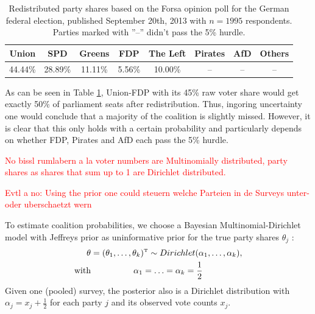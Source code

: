 \documentclass[smallcondensed]{svjour3}     %
\newcommand{\T}{\mathrm{\scriptscriptstyle T}}
\newcommand{\red}[1]{\textcolor{red}{#1}}
\begin{document}
\begin{table}[!ht]\centering
\caption{Redistributed party shares based on the Forsa opinion poll for the German federal election, published September 20th, 2013 with $n=1995$ respondents. Parties marked with ''--'' didn't pass the 5\% hurdle.
\label{bauer:tab_fdp_redist}
}
\medskip
\begin{tabular}{cccccccc}
\toprule[0.09 em]
Union & SPD & Greens & FDP & The Left & Pirates & AfD & Others \\
\midrule
44.44\% & 28.89\% & 11.11\% & 5.56\% & 10.00\% & -- & -- & -- \\
\bottomrule[0.09 em]
\end{tabular}
\end{table}

As can be seen in Table \ref{bauer:tab_fdp_redist}, Union-FDP with its 45\% raw voter share would get exactly 50\% of parliament seats after redistribution. Thus, ingoring uncertainty one would conclude that a majority of the coalition is slightly missed. However, it is clear that this only holds with a certain probability and particularly depends on whether FDP, Pirates and AfD each pass the 5\% hurdle.

\red{No bissl rumlabern a la voter numbers are Multinomially distributed, party shares as shares that sum up to 1 are Dirichlet distributed.}

\red{Evtl a no: Using the prior one could steuern welche Parteien in de Surveys unter- oder uberschaetzt wern}

To estimate coalition probabilities, we choose a Bayesian Multinomial-Dirichlet model
with Jeffreys prior as uninformative prior for the true party shares
$\theta_j$ \citep{gelman_2013}:
\begin{equation}
\begin{aligned}
\boldmath{\theta} &= (\theta_1,\ldots,\theta_k)^\T \sim Dirichlet(\alpha_1,\ldots,\alpha_k), \\
\text{with} &\ \ \ \ \ \ \ \ \ \ \ \ \ \ \ \alpha_1 = \ldots = \alpha_k = \frac{1}{2}
\end{aligned}
\end{equation}
Given one (pooled) survey, the posterior also is a Dirichlet distribution
with $\alpha_j = x_j + \frac{1}{2}$ for each party $j$ and its observed
vote counts $x_j$.
\end{document}
